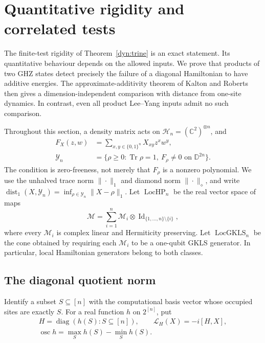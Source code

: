 \documentclass[reqno]{amsart}
\theoremstyle{definition}
\theoremstyle{remark}
\newcommand{\C}{\mathbb C}
\newcommand{\D}{\mathbb D}
\DeclareMathOperator{\Tr}{Tr}
\DeclareMathOperator{\Id}{Id}
\DeclareMathOperator{\diag}{diag}
\begin{document}

\section{Quantitative rigidity and correlated tests}
\label{rob:section}

The finite-test rigidity of Theorem~\ref{dyn:trine} is an exact statement.
Its quantitative behaviour depends on the allowed inputs.  We prove that
products of two GHZ states detect precisely the failure of a diagonal
Hamiltonian to have additive energies.  The approximate-additivity theorem
of Kalton and Roberts then gives a dimension-independent comparison with
distance from one-site dynamics.  In contrast, even all product Lee--Yang
inputs admit no such comparison.

Throughout this section, a density matrix acts on
$\mathcal H_n=(\C^2)^{\otimes n}$, and
\begin{align*}
 F_X(z,w)&=\sum_{x,y\in\{0,1\}^n}X_{xy}z^xw^y,\\
 \mathcal Y_n&=\{\rho\geq0:\Tr\rho=1,\ 
                 F_\rho\ne0\text{ on }\D^{2n}\}.
\end{align*}
The condition is zero-freeness, not merely that $F_\rho$ is a nonzero
polynomial.  We use the unhalved trace norm $\|\cdot\|_1$ and diamond norm
$\|\cdot\|_\diamond$, and write
$\operatorname{dist}_1(X,\mathcal Y_n)=
\inf_{\rho\in\mathcal Y_n}\|X-\rho\|_1$.
Let $\operatorname{LocHP}_n$ be the real vector space of maps
\[
 \mathcal M=\sum_{i=1}^n
       \mathcal M_i\otimes\Id_{\{1,\ldots,n\}\setminus\{i\}},
\]
where every $\mathcal M_i$ is complex linear and Hermiticity preserving.
Let $\operatorname{LocGKLS}_n$ be the cone obtained by requiring each
$\mathcal M_i$ to be a one-qubit GKLS generator.  In particular, local
Hamiltonian generators belong to both classes.

\subsection{The diagonal quotient norm}

Identify a subset $S\subseteq[n]$ with the computational basis vector
whose occupied sites are exactly $S$.  For a real function $h$ on $2^{[n]}$,
put
\begin{gather*}
 H=\diag(h(S):S\subseteq[n]),\qquad
 \mathcal L_H(X)=-i[H,X],\\
 \operatorname{osc}h=\max_S h(S)-\min_S h(S).
\end{gather*}
\end{document}
